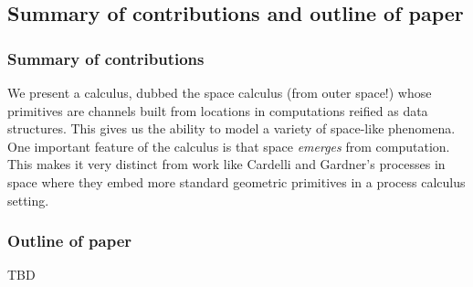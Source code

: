 \subsection{Summary of contributions and outline of paper}

\subsubsection{Summary of contributions}
We present a calculus, dubbed the space calculus (from outer space!)
whose primitives are channels built from locations in computations
reified as data structures. This gives us the ability to model a
variety of space-like phenomena. One important feature of the calculus
is that space \emph{emerges} from computation. This makes it very
distinct from work like Cardelli and Gardner's processes in space
\cite{DBLP:conf/cie/CardelliG10} where they embed more standard
geometric primitives in a process calculus setting.

\subsubsection{Outline of paper}
TBD

